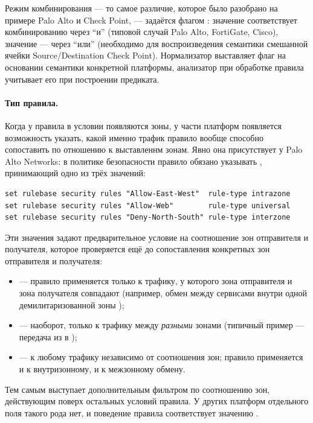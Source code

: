 Режим комбинирования --- то самое различие, которое было разобрано на примере Palo Alto и Check Point, --- задаётся флагом : значение  соответствует комбинированию через ``и'' (типовой случай Palo Alto, FortiGate, Cisco), значение  --- через ``или'' (необходимо для воспроизведения семантики смешанной ячейки Source/Destination Check Point). Нормализатор выставляет флаг на основании семантики конкретной платформы, анализатор при обработке правила учитывает его при построении предиката.

\paragraph{Тип правила.} Когда у правила в условии появляются зоны, у части платформ появляется возможность указать, какой именно трафик правило вообще способно сопоставить по отношению к выставленнм зонам. Явно она присутствует у Palo Alto Networks: в политике безопасности правило обязано указывать , принимающий одно из трёх значений:

\begin{verbatim}
set rulebase security rules "Allow-East-West"  rule-type intrazone
set rulebase security rules "Allow-Web"        rule-type universal
set rulebase security rules "Deny-North-South" rule-type interzone
\end{verbatim}

Эти значения задают предварительное условие на соотношение зон отправителя и получателя, которое проверяется ещё до сопоставления конкретных зон отправителя и получателя:
\begin{itemize}
    \item {} --- правило применяется только к трафику, у которого зона отправителя и зона получателя совпадают (например, обмен между сервисами внутри одной демилитаризованной зоны );
    \item {} --- наоборот, только к трафику между \emph{разными} зонами (типичный пример --- передача из  в );
    \item {} --- к любому трафику независимо от соотношения зон; правило применяется и к внутризонному, и к межзонному обмену.
\end{itemize}

Тем самым  выступает дополнительным фильтром по соотношению зон, действующим поверх остальных условий правила. У других платформ отдельного поля такого рода нет, и поведение правила соответствует значению .

